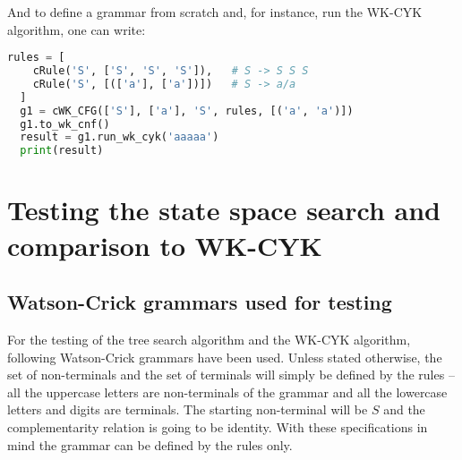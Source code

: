 And to define a grammar from scratch and, for instance, run the WK-CYK algorithm, one can write:
\begin{lstlisting}[language=Python]
  rules = [
    cRule('S', ['S', 'S', 'S']),   # S -> S S S
    cRule('S', [(['a'], ['a'])])   # S -> a/a
  ]
  g1 = cWK_CFG(['S'], ['a'], 'S', rules, [('a', 'a')])
  g1.to_wk_cnf()
  result = g1.run_wk_cyk('aaaaa')
  print(result)
\end{lstlisting}


\chapter{Testing the state space search and comparison to WK-CYK}

\section{Watson-Crick grammars used for testing}

For the testing of the tree search algorithm and the WK-CYK algorithm, following Watson-Crick grammars have been used. Unless stated otherwise, the set of non-terminals and the set of terminals will simply be defined by the rules -- all the uppercase letters are non-terminals of the grammar and all the lowercase letters and digits are terminals. The starting non-terminal will be $S$ and the complementarity relation is going to be identity. With these specifications in mind the grammar can be defined by the rules only.

